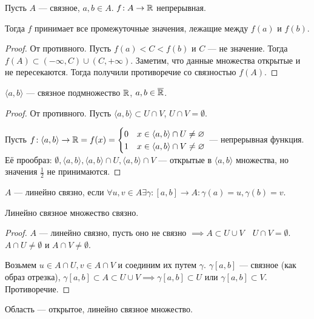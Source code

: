 \begin{consequence}
    Пусть $A$ --- связное, $a, b \in A$. $f\!: A \to \mathbb{R}$ непрерывная. 

    Тогда  $f$ принимает все промежуточные значения, лежащие между  $f(a)$ и  $f(b)$.
\end{consequence}
\begin{proof}
    От противного. Пусть $f(a) < C < f(b)$ и $C$ --- не значение. Тогда  $f(A) \subset (-\infty, C) \cup (C, +\infty)$. Заметим, что данные множества открытые и не пересекаются. Тогда получили противоречие со связностью  $f(A)$.
\end{proof}
\begin{theorem}
    $\langle a, b \rangle$ --- связное подмножество  $\mathbb{R}$,  $a, b \in \overline{\mathbb{R}}$.
\end{theorem}
\begin{proof}
    От противного. Пусть $\langle a, b \rangle \subset U \cap V$,  $U \cap V = \emptyset$. 

    Пусть  $f\!: \langle a, b \rangle \to \mathbb{R} = f(x) = \begin{cases} 0 & x \in \langle a, b \rangle \cap U \neq \varnothing \\ 1 & x \in \langle a, b \rangle \cap V \neq \varnothing \end{cases}$ --- непрерывная функция. Её прообраз:  $\emptyset, \langle a, b \rangle, \langle a, b \rangle \cap U, \langle a, b \rangle \cap V$ --- открытые в  $\langle a, b \rangle$ множества, но значения  $\frac{1}{2}$ не принимаются.
\end{proof}
\begin{definition}
    $A$ --- линейно связно, если  $\forall u, v \in A \exists \gamma\!: [a, b] \to A\!: \gamma(a) = u, \gamma(b) = v$.
\end{definition}
\begin{theorem}
    Линейно связное множество связно.
\end{theorem}
\begin{proof}
    $A$ --- линейно связно, пусть оно не связно $\implies A \subset U \cup V\quad U \cap V = \emptyset$.  $A \cap U \neq \emptyset$ и  $A \cap V \neq \emptyset$. 

    Возьмем  $u \in A \cap U, v \in A \cap V$ и соединим их путем  $\gamma$.  $\gamma[a,b]$ --- связное (как образ отрезка),  $\gamma[a, b] \subset A \subset U \cup V \implies \gamma[a, b] \subset U$ или $\gamma[a, b] \subset V$. Противоречие. 
\end{proof}
\begin{definition}
    Область --- открытое, линейно связное множество.
\end{definition}
